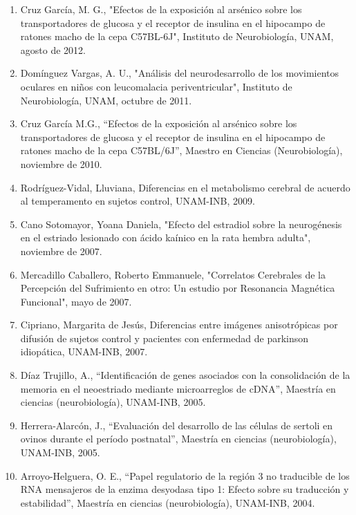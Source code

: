 \documentclass[11pt]{article}
\begin{document}
\begin{enumerate}
\item Cruz García, M. G., "Efectos de la exposición al arsénico sobre los transportadores de glucosa y el receptor de insulina en el hipocampo de ratones 
macho de 
la cepa C57BL-6J", Instituto de Neurobiología, UNAM,   agosto de 2012.

\item Domínguez Vargas, A. U., "Análisis del neurodesarrollo de los movimientos oculares en niños con leucomalacia periventricular", Instituto de 
Neurobiología, 
UNAM,   octubre de 2011.

\item Cruz García M.G., “Efectos de la exposición al arsénico sobre los transportadores de glucosa y el receptor de insulina en el hipocampo de ratones 
macho de 
la cepa C57BL/6J”, Maestro en Ciencias (Neurobiología),   noviembre de 2010.

\item Rodríguez-Vidal, Lluviana, Diferencias en el metabolismo cerebral de acuerdo al temperamento en sujetos control, UNAM-INB,   2009.

\item Cano Sotomayor, Yoana Daniela, "Efecto del estradiol sobre la neurogénesis en el estriado lesionado con ácido kaínico en la rata hembra adulta",   
noviembre 
de 2007.

\item Mercadillo Caballero, Roberto Emmanuele, "Correlatos Cerebrales de la Percepción del Sufrimiento en otro: Un estudio por Resonancia Magnética 
Funcional",   
mayo de 2007.

\item Cipriano, Margarita de Jesús, Diferencias entre imágenes anisotrópicas por difusión de sujetos control y pacientes con enfermedad de parkinson 
idiopática, 
UNAM-INB,   2007.

\item Díaz Trujillo, A., “Identificación de genes asociados con la consolidación de la memoria en el neoestriado mediante microarreglos de cDNA”, Maestría 
en 
ciencias (neurobiología), UNAM-INB,   2005.

\item Herrera-Alarcón, J., “Evaluación del desarrollo de las células de sertoli en ovinos durante el período postnatal”, Maestría en ciencias 
(neurobiología), 
UNAM-INB,   2005.

\item Arroyo-Helguera, O. E., “Papel regulatorio de la región 3 no traducible de los RNA mensajeros de la enzima desyodasa tipo 1: Efecto sobre su 
traducción y 
estabilidad”, Maestría en ciencias (neurobiología), UNAM-INB,   2004.


\end{enumerate}
\end{document}
